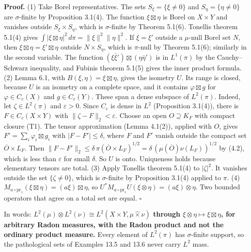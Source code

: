 \documentclass[
  english,
  11pt,
  a4paper,
]{article}
\begin{document}
\textbf{Proof.} (1) Take Borel representatives. The sets
\(S_\xi=\{\xi\neq0\}\) and \(S_\eta=\{\eta\neq0\}\) are
\(\sigma\)-finite by Proposition 3.1(4). The function
\(\xi\boxtimes\eta\) is Borel on \(X\times Y\) and vanishes outside
\(S_\xi\times S_\eta\), which is \(\sigma\)-finite by Theorem 5.1(6).
Tonelli\textquotesingle s theorem 5.1(4) gives
\(\int|\xi\boxtimes\eta|^2\,d\pi=\|\xi\|^2\|\eta\|^2\). If \(\xi=\xi'\)
outside a \(\mu\)-null Borel set \(N\), then
\(\xi\boxtimes\eta=\xi'\boxtimes\eta\) outside \(N\times S_\eta\), which
is \(\pi\)-null by Theorem 5.1(6); similarly in the second variable. The
function \((\xi\bar\xi')\boxtimes(\eta\bar\eta')\) is in \(L^1(\pi)\) by
the Cauchy--Schwarz inequality, and Fubini\textquotesingle s theorem
5.1(5) gives the inner product formula. (2) Lemma 6.1, with
\(B(\xi,\eta)=\xi\boxtimes\eta\), gives the isometry \(U\). Its range is
closed, because \(U\) is an isometry on a complete space, and it
contains \(\varphi\boxtimes g\) for \(\varphi\in C_c(X)\) and
\(g\in C_c(Y)\). These span a dense subspace of \(L^2(\pi)\). Indeed,
let \(\zeta\in L^2(\pi)\) and \(\varepsilon>0\). Since \(C_c\) is dense
in \(L^2\) (Proposition 3.1(4)), there is \(F\in C_c(X\times Y)\) with
\(\|\zeta-F\|_2<\varepsilon\). Choose an open \(O\supseteq K_F\) with
compact closure (T1). The tensor approximation (Lemma 4.1(2)), applied
with \(O\), gives \(F'=\sum_i\varphi_i\boxtimes g_i\) with
\(|F-F'|\leq\delta\), where \(F\) and \(F'\) vanish outside the compact
set \(\overline O\times L_F\). Then
\(\|F-F'\|_2\leq\delta\,\pi(\overline O\times L_F)^{1/2}=\delta\,(\mu(\overline O)\nu(L_F))^{1/2}\)
by (4.2), which is less than \(\varepsilon\) for small \(\delta\). So
\(U\) is onto. Uniqueness holds because elementary tensors are total.
(3) Apply Tonelli\textquotesingle s theorem 5.1(4) to \(|\zeta|^2\). It
vanishes outside the set \(\{\zeta\neq0\}\), which is \(\sigma\)-finite
by Proposition 3.1(4) applied to \(\pi\). (4)
\(M_{a\circ\mathrm{pr}_1}(\xi\boxtimes\eta)=(a\xi)\boxtimes\eta\), so
\(U^*M_{a\circ\mathrm{pr}_1}U(\xi\otimes\eta)=(a\xi)\otimes\eta\). Two
bounded operators that agree on a total set are equal. \(\square\)

In words:
\textbf{\(L^2(\mu)\otimes L^2(\nu)\cong L^2(X\times Y,\mu\hat\times\nu)\)
through \(\xi\otimes\eta\mapsto\xi\boxtimes\eta\), for arbitrary Radon
measures, with the Radon product and not the ordinary product measure.}
Every element of \(L^2(\pi)\) has \(\sigma\)-finite support, so the
pathological sets of Examples 13.5 and 13.6 never carry \(L^2\) mass.
\end{document}

